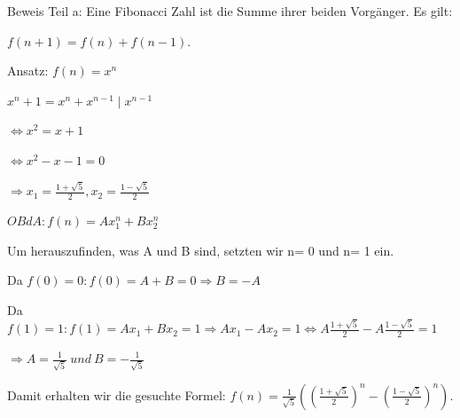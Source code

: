 \documentclass[10pt]{beamer}
\begin{document}
\begin{frame}{Beweis Teil a:}
Eine Fibonacci Zahl ist die Summe ihrer beiden Vorgänger. Es gilt:

\vspace{0.2cm}
 $f(n+1)= f(n) + f(n-1)$.

 
\vspace{0.3cm}
\noindent Ansatz: $ f(n) = x^n $


\vspace{0.2cm}
$x^n+1 = x^n + x^{n-1}    \mid x^{n-1}$

$\Leftrightarrow x^2 = x+1 $

 $\Leftrightarrow x^2 -x- 1 = 0$ 
\vspace{0.15cm}


$ \Rightarrow x_1 = \frac{1 + \sqrt{5}}{2} ,  x_2= \frac{1 - \sqrt{5}}{2}$

    
\end{frame}

\begin{frame}

$OBdA: f(n)= Ax_1^n + Bx_2^n$

\vspace{0.2cm}
\noindent Um herauszufinden, was A und B sind, setzten wir n= 0 und n= 1 ein. 

\vspace{0.2cm}

Da  $f(0)= 0:  f(0)= A+B= 0  \Rightarrow B= -A$

Da $ f(1)= 1: f(1)= Ax_1+ Bx_2= 1 \Rightarrow Ax_1 - Ax_2= 1 \Leftrightarrow  A \frac{1 + \sqrt{5}}{2} -A \frac{1 - \sqrt{5}}{2}= 1 $

\vspace{0.15cm}

$\Rightarrow A= \frac{1}{\sqrt{5}} \ und  \ B= - \frac{1}{\sqrt{5}}$

\vspace{0.3cm}

\noindent Damit erhalten wir die gesuchte Formel: $f(n)= \frac{1}{\sqrt{5}} ((\frac{1 + \sqrt{5}}{2})^n - ( \frac{1 - \sqrt{5}}{2})^n)$.

    
\end{frame}
\end{document}
